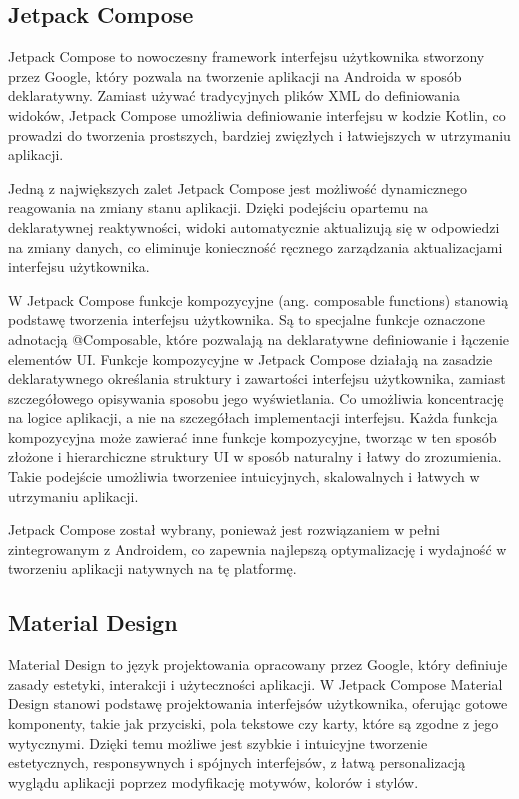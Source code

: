 \documentclass[12pt,twoside]{article}
\begin{document}
\subsection{Jetpack Compose}

Jetpack Compose to nowoczesny framework interfejsu użytkownika stworzony przez Google, który pozwala 
na tworzenie aplikacji na Androida w sposób deklaratywny. Zamiast używać tradycyjnych plików XML do 
definiowania widoków, Jetpack Compose umożliwia definiowanie interfejsu w kodzie Kotlin, co prowadzi 
do tworzenia prostszych, bardziej zwięzłych i łatwiejszych w utrzymaniu aplikacji.

Jedną z największych zalet Jetpack Compose jest możliwość dynamicznego reagowania na zmiany stanu aplikacji. 
Dzięki podejściu opartemu na deklaratywnej reaktywności, widoki automatycznie aktualizują się w odpowiedzi na 
zmiany danych, co eliminuje konieczność ręcznego zarządzania aktualizacjami interfejsu użytkownika.

W Jetpack Compose funkcje kompozycyjne (ang. composable functions) stanowią podstawę tworzenia interfejsu 
użytkownika. Są to specjalne funkcje oznaczone adnotacją @Composable, które pozwalają na deklaratywne definiowanie 
i łączenie elementów UI. Funkcje kompozycyjne w Jetpack Compose działają na zasadzie deklaratywnego określania 
struktury i zawartości interfejsu użytkownika, zamiast szczegółowego opisywania sposobu jego wyświetlania. Co 
umożliwia koncentrację na logice aplikacji, a nie na szczegółach implementacji interfejsu. Każda funkcja 
kompozycyjna może zawierać inne funkcje kompozycyjne, tworząc w ten sposób złożone i hierarchiczne struktury UI 
w sposób naturalny i łatwy do zrozumienia. Takie podejście umożliwia tworzeniee intuicyjnych, skalowalnych i łatwych 
w utrzymaniu aplikacji.

Jetpack Compose został wybrany, ponieważ jest rozwiązaniem w pełni zintegrowanym z Androidem, 
co zapewnia najlepszą optymalizację i wydajność w tworzeniu aplikacji natywnych na tę platformę.

\subsection{Material Design}

Material Design to język projektowania opracowany przez Google, który definiuje zasady estetyki, interakcji i 
użyteczności aplikacji. W Jetpack Compose Material Design stanowi podstawę projektowania interfejsów użytkownika, 
oferując gotowe komponenty, takie jak przyciski, pola tekstowe czy karty, które są zgodne z jego wytycznymi. 
Dzięki temu możliwe jest szybkie i intuicyjne tworzenie estetycznych, responsywnych i spójnych interfejsów, z 
łatwą personalizacją wyglądu aplikacji poprzez modyfikację motywów, kolorów i stylów.
\end{document}
